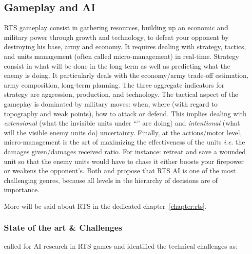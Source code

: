 \subsection{Gameplay and AI}
RTS gameplay consist in gathering resources, building up an economic and military power through growth and technology, to defeat your opponent by destroying his base, army and economy. It requires dealing with strategy, tactics, and units management (often called micro-management) in real-time. Strategy consist in what will be done in the long term as well as predicting what the enemy is doing. It particularly deals with the economy/army trade-off estimation, army composition, long-term planning. The three aggregate indicators for strategy are aggression, production, and technology. The tactical aspect of the gameplay is dominated by military moves: when, where (with regard to topography and weak points), how to attack or defend. This implies dealing with \textit{extensional} (what the invisible units under ``'' are doing) and \textit{intentional} (what will the visible enemy units do) uncertainty. Finally, at the actions/motor level, micro-management is the art of maximizing the effectiveness of the units \textit{i.e.} the damages given/damages received ratio. For instance: retreat and save a wounded unit so that the enemy units would have to chase it either boosts your firepower or weakens the opponent's. Both \citep{Human-LevelAIKillerApplication} and \cite{gunn} propose that RTS AI is one of the most challenging genres, because all levels in the hierarchy of decisions are of importance.

More will be said about RTS in the dedicated chapter~\ref{chapter:rts}.

\subsubsection{State of the art \& Challenges}
\citet{Buro04callfor} called for AI research in RTS games and identified the technical challenges as:%

